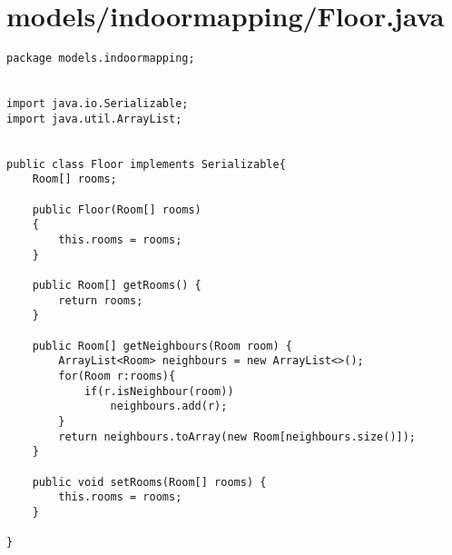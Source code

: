 \documentclass{article}
\begin{document}
\section{models/indoormapping/Floor.java}
\begin{lstlisting}package models.indoormapping;


import java.io.Serializable;
import java.util.ArrayList;


public class Floor implements Serializable{
    Room[] rooms;

    public Floor(Room[] rooms)
    {
        this.rooms = rooms;
    }

    public Room[] getRooms() {
        return rooms;
    }

    public Room[] getNeighbours(Room room) {
        ArrayList<Room> neighbours = new ArrayList<>();
        for(Room r:rooms){
            if(r.isNeighbour(room))
                neighbours.add(r);
        }
        return neighbours.toArray(new Room[neighbours.size()]);
    }

    public void setRooms(Room[] rooms) {
        this.rooms = rooms;
    }

}
\end{lstlisting}
\newpage
\end{document}
